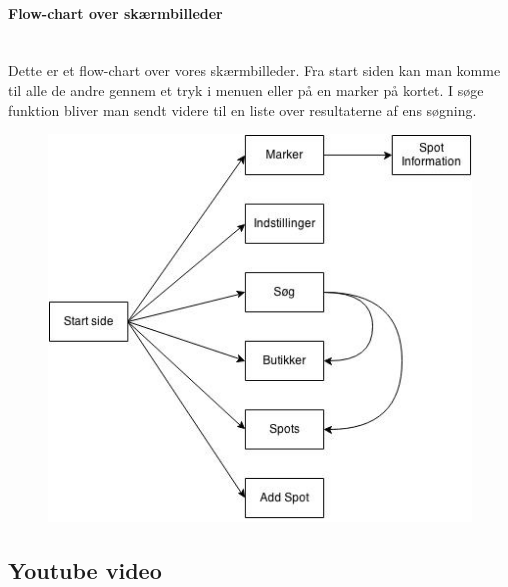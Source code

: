 \documentclass[12pt]{article}
\begin{document}
\newpage
\paragraph{Flow-chart over skærmbilleder}\mbox{}\\
Dette er et flow-chart over vores skærmbilleder. Fra start siden kan man komme til alle de andre gennem et tryk i menuen eller på en marker på kortet. I søge funktion bliver man sendt videre til en liste over resultaterne af ens søgning.
\begin{figure}[h]
\includegraphics[scale = 0.8]{flowDiagram}
\end{figure}
\newpage
\subsection*{Youtube video}
\end{document}

